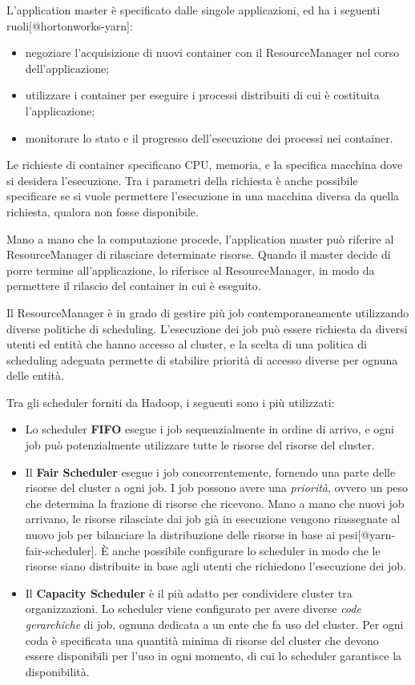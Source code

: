 \documentclass[italian,a4paper, twoside, 12pt]{report}
\providecommand{\tightlist}{%
  \setlength{\itemsep}{0pt}\setlength{\parskip}{0pt}}
\begin{document}
L'application master è specificato dalle singole applicazioni, ed ha i
seguenti ruoli{[}@hortonworks-yarn{]}:

\begin{itemize}
\tightlist
\item
  negoziare l'acquisizione di nuovi container con il ResourceManager nel
  corso dell'applicazione;
\item
  utilizzare i container per eseguire i processi distribuiti di cui è
  costituita l'applicazione;
\item
  monitorare lo stato e il progresso dell'esecuzione dei processi nei
  container.
\end{itemize}

Le richieste di container specificano CPU, memoria, e la specifica
macchina dove si desidera l'esecuzione. Tra i parametri della richiesta
è anche possibile specificare se si vuole permettere l'esecuzione in una
macchina diversa da quella richiesta, qualora non fosse disponibile.

Mano a mano che la computazione procede, l'application master può
riferire al ResourceManager di rilasciare determinate risorse. Quando il
master decide di porre termine all'applicazione, lo riferisce al
ResourceManager, in modo da permettere il rilascio del container in cui
è eseguito.

Il ResourceManager è in grado di gestire più job contemporaneamente
utilizzando diverse politiche di scheduling. L'esecuzione dei job può
essere richiesta da diversi utenti ed entità che hanno accesso al
cluster, e la scelta di una politica di scheduling adeguata permette di
stabilire priorità di accesso diverse per ognuna delle entità.

Tra gli scheduler forniti da Hadoop, i seguenti sono i più utilizzati:

\begin{itemize}
\item
  Lo scheduler \textbf{FIFO} esegue i job sequenzialmente in ordine di
  arrivo, e ogni job può potenzialmente utilizzare tutte le risorse del
  risorse del cluster.
\item
  Il \textbf{Fair Scheduler} esegue i job concorrentemente, fornendo una
  parte delle risorse del cluster a ogni job. I job possono avere una
  \emph{priorità}, ovvero un peso che determina la frazione di risorse
  che ricevono. Mano a mano che nuovi job arrivano, le risorse
  rilasciate dai job già in esecuzione vengono riassegnate al nuovo job
  per bilanciare la distribuzione delle risorse in base ai
  pesi{[}@yarn-fair-scheduler{]}. È anche possibile configurare lo
  scheduler in modo che le risorse siano distribuite in base agli utenti
  che richiedono l'esecuzione dei job.
\item
  Il \textbf{Capacity Scheduler} è il più adatto per condividere cluster
  tra organizzazioni. Lo scheduler viene configurato per avere diverse
  \emph{code gerarchiche} di job, ognuna dedicata a un ente che fa uso
  del cluster. Per ogni coda è specificata una quantità minima di
  risorse del cluster che devono essere disponibili per l'uso in ogni
  momento, di cui lo scheduler garantisce la disponibilità.
\end{itemize}
\end{document}
